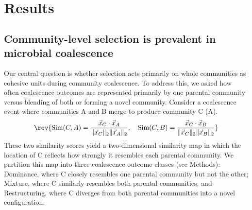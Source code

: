 \section{Results}
\label{sec:results}



\subsection{Community-level selection is prevalent in microbial coalescence}
\label{sec:results:dominance_prevalent}

Our central question is whether selection acts primarily on whole communities as cohesive units during community coalescence. To address this, we asked how often coalescence outcomes are represented primarily by one parental community versus blending of both or forming a novel community. Consider a coalescence event where communities A and B merge to produce community C (A). 
\begin{equation}
\rev{\text{Sim}(C, A) = \frac{\vec{x}_C \cdot \vec{x}_A}{\|\vec{x}_C\|_2 \|\vec{x}_A\|_2}, \quad \text{Sim}(C, B) = \frac{\vec{x}_C \cdot \vec{x}_B}{\|\vec{x}_C\|_2 \|\vec{x}_B\|_2}}
\label{eq:similarity}
\end{equation}
 These two similarity scores yield a two-dimensional similarity map in which the location of C reflects how strongly it resembles each parental community. We partition this map into three coalescence outcome classes (see Methods): Dominance, where C closely resembles one parental community but not the other; Mixture, where C similarly resembles both parental communities; and Restructuring, where C diverges from both parental communities into a novel configuration.  

